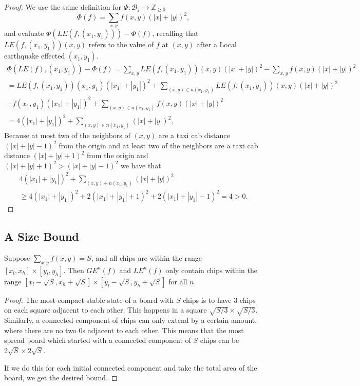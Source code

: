 \documentclass[runningheads,a4paper]{llncs}
\begin{document}
\begin{proof}
We use the same definition for $\Phi: \mathcal{B}_f \rightarrow \mathbb{Z}_{\geq 0}$ 
\[ \Phi(f) = \sum_{x,y} f(x,y)(|x|+|y|)^2, \]
and evaluate $\Phi(LE(f, (x_1,y_1))) - \Phi(f)$, recalling that $LE(f, (x_1, y_1))(x,y)$ refers to the value of  $f$ at $(x,y)$ after a Local earthquake effected $(x_1, y_1)$.
\begin{align*}
\Phi(LE(f), (x_1, y_1)) - \Phi(f) =\sum_{x,y} LE(f, (x_1, y_1))(x,y)(|x|+|y|)^2 - \sum_{x,y} f(x,y)(|x|+|y|)^2 \\
= LE(f, (x_1, y_1))(x_1,y_1)(|x_1|+|y_1|)^2 + \sum_{(x,y) \in n(x_1,y_1)} LE(f, (x_1, y_1)) (x,y) (|x|+|y|)^2 \\- f(x_1,y_1)(|x_1|+|y_1|)^2 + \sum_{(x,y) \in n(x_1, y_1)} f(x,y)(|x|+|y|)^2 \\
= 4(|x_1| + |y_1|)^2 +\sum_{(x,y) \in n(x_1, y_1)} (|x| + |y|)^2,
\end{align*}
Because at most two of the neighbors of $(x,y)$ are a taxi cab distance $(|x|+|y|-1)^2$ from the origin and at least two of the neighbors are a taxi cab distance $(|x|+|y|+1)^2$ from the origin and $(|x|+|y|+1)^2 > (|x|+|y|-1)^2$ we have that 
\begin{align*}
4(|x_1| + |y_1|)^2 +\sum_{(x,y) \in n(x_1, y_1)} (|x| + |y|)^2  \\ 
\geq 4(|x_1| + |y_1|)^2 + 2 (|x_1| + |y_1|+1)^2 + 2 (|x_1| + |y_1|-1)^2 = 4 >0.
\end{align*}
\end{proof}

\subsection{A Size Bound}
\begin{lemma}
\label{finiteextension}
Suppose $\sum_{x,y} f(x,y) = S$, and all chips are within the range $[x_l, x_h] \times [y_l, y_h]$. Then $GE^n(f)$ and $LE^n(f)$ only contain chips within the range $[x_l - \sqrt{S}, x_h + \sqrt{S}] \times [y_l-\sqrt{S}, y_h+\sqrt{S}]$ for all $n$.
\end{lemma}

\begin{proof}
The most compact stable state of a board with $S$ chips is to have $3$ chips on each square adjacent to each other. This happens in a square $\sqrt{S/3} \times \sqrt{S/3}$. Similarly, a connected component of chips can only extend by a certain amount, where there are no two 0s adjacent to each other. This means that the most spread board which started with a connected component of $S$ chips can be $2\sqrt{S} \times 2\sqrt{S}$. 

If we do this for each initial connected component and take the total area of the board, we get the desired bound.
\end{proof}
\end{document}
